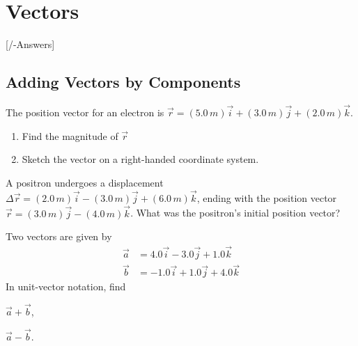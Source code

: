 
\chapter{Vectors}\label{\currfilebase}
[\currfilebase/\currfilebase-Answers]
%

\section{Adding Vectors by Components}

\begin{problem}
	The position vector for an electron is $\vec r = (5.0\,m)\vec i + (3.0\,m)\vec j+ (2.0\,m)\vec k $.
	\begin{enumerate}[label = (\alph*)]
		\item Find the magnitude of $\vec r$
		\item Sketch the vector on a right-handed coordinate system.
	\end{enumerate}
\end{problem}


\begin{problem}
	A positron undergoes a displacement $\Delta \vec r = (2.0\, m) \vec i - (3.0\, m) \vec j + (6.0\,m)\vec k$,
	ending with the position vector $\vec r = (3.0\, m) \vec j - (4.0\,m)\vec k$. What was the positron’s initial position vector?
\end{problem}

\begin{problem}
	Two vectors are given by
	\begin{align*}
		\vec a &= 4.0\vec i - 3.0\vec j + 1.0\vec k \\
		\vec b &= -1.0\vec i + 1.0\vec j + 4.0\vec k
	\end{align*}
	In unit-vector notation, find
	 \begin{enumerate*}[label = (\alph*)]
		\item $\vec a + \vec b$, 
		\item $\vec a - \vec b$.
	\end{enumerate*}
\end{problem}


